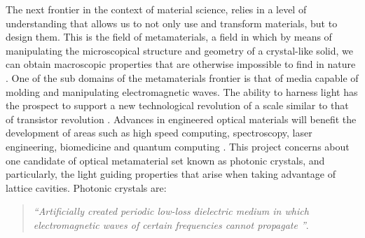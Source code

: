 The next frontier in the context of material science, relies in a level of understanding that allows us to not only use and transform materials, but to design them. This is the field of metamaterials, a field in which by means of manipulating the microscopical structure and geometry of a crystal-like solid, we can obtain macroscopic properties that are otherwise impossible to find in nature \cite{Engheta2006, Capoliono2009}. One of the sub domains of the metamaterials frontier is that of media capable of molding and manipulating electromagnetic waves. The ability to harness light has the prospect to support a new technological revolution of a scale similar to that of transistor revolution \cite{Joannopoulos2008}.
Advances in engineered optical materials will benefit the development of areas such as high speed computing, spectroscopy, laser engineering, biomedicine and quantum computing \cite{Obayya2011}. 
This project concerns about one candidate of optical metamaterial set known as photonic crystals, and particularly, the light guiding properties that arise when taking advantage of lattice cavities.
Photonic crystals are: 

\begin{quote}
\textit{``Artificially created periodic low-loss dielectric medium in which electromagnetic waves of certain frequencies cannot propagate \cite{GangBao1987}''}.  
\end{quote} 

